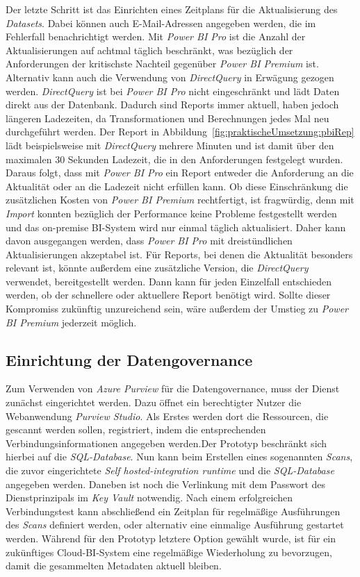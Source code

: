 Der letzte Schritt ist das Einrichten eines Zeitplans für die Aktualisierung des \textit{Datasets}. Dabei können auch E-Mail-Adressen angegeben werden, die im Fehlerfall benachrichtigt werden. Mit \textit{Power BI Pro} ist die Anzahl der Aktualisierungen auf achtmal täglich beschränkt, was bezüglich der Anforderungen der kritischste Nachteil gegenüber \textit{Power BI Premium} ist. Alternativ kann auch die Verwendung von \textit{DirectQuery} in Erwägung gezogen werden. \textit{DirectQuery} ist bei \textit{Power BI Pro} nicht eingeschränkt und lädt Daten direkt aus der Datenbank. Dadurch sind Reports immer aktuell, haben jedoch längeren Ladezeiten, da Transformationen und Berechnungen jedes Mal neu durchgeführt werden. Der Report in Abbildung~\ref{fig:praktischeUmsetzung:pbiRep} lädt beispielsweise mit \textit{DirectQuery} mehrere Minuten und ist damit über den maximalen 30 Sekunden Ladezeit, die in den Anforderungen festgelegt wurden. Daraus folgt, dass mit \textit{Power BI Pro} ein Report entweder die Anforderung an die Aktualität oder an die Ladezeit nicht erfüllen kann. Ob diese Einschränkung die zusätzlichen Kosten von \textit{Power BI Premium} rechtfertigt, ist fragwürdig, denn mit \textit{Import} konnten bezüglich der Performance keine Probleme festgestellt werden und das on-premise BI-System wird nur einmal täglich aktualisiert. Daher kann davon ausgegangen werden, dass \textit{Power BI Pro} mit dreistündlichen Aktualisierungen akzeptabel ist. Für Reports, bei denen die Aktualität besonders relevant ist, könnte außerdem eine zusätzliche Version, die \textit{DirectQuery} verwendet, bereitgestellt werden. Dann kann für jeden Einzelfall entschieden werden, ob der schnellere oder aktuellere Report benötigt wird. Sollte dieser Kompromiss zukünftig unzureichend sein, wäre außerdem der Umstieg zu \textit{Power BI Premium} jederzeit möglich.

\cite[vgl.][]{pearson_pro_2020}

\subsection{Einrichtung der Datengovernance}
Zum Verwenden von \textit{Azure Purview} für die Datengovernance, muss der Dienst zunächst eingerichtet werden. Dazu öffnet ein berechtigter Nutzer die Webanwendung \textit{Purview Studio}. Als Erstes werden dort die Ressourcen, die gescannt werden sollen, registriert, indem die entsprechenden Verbindungsinformationen angegeben werden.Der Prototyp beschränkt sich hierbei auf die \textit{SQL-Database}. Nun kann beim Erstellen eines sogenannten \textit{Scans}, die zuvor eingerichtete \textit{Self hosted-integration runtime} und die \textit{SQL-Database} angegeben werden. Daneben ist noch die Verlinkung mit dem Passwort des Dienstprinzipals im \textit{Key Vault} notwendig. Nach einem erfolgreichen Verbindungstest kann abschließend ein Zeitplan für regelmäßige Ausführungen des \textit{Scans} definiert werden, oder alternativ eine einmalige Ausführung gestartet werden. Während für den Prototyp letztere Option gewählt wurde, ist für ein zukünftiges Cloud-BI-System eine regelmäßige Wiederholung zu bevorzugen, damit die gesammelten Metadaten aktuell bleiben. 

